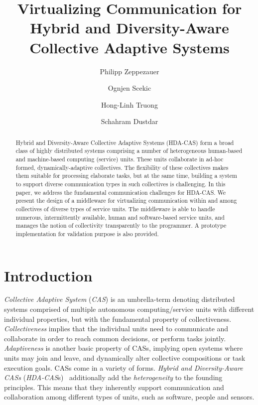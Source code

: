 \documentclass{llncs}
\begin{document}
%
\pagestyle{headings}  %

%
\title{Virtualizing Communication for Hybrid and Diversity-Aware Collective Adaptive Systems}
\author{Philipp Zeppezauer \and Ognjen Scekic \and Hong-Linh Truong \and Schahram Dustdar}


\maketitle


\begin{abstract}

Hybrid and Diversity-Aware Collective Adaptive Systems (HDA-CAS) form a broad class of highly distributed systems comprising a number of heterogeneous human-based and machine-based computing (service) units. These units collaborate in ad-hoc formed, dynamically-adaptive collectives. The flexibility of these collectives makes them suitable for processing elaborate tasks, but at the same time, building a system to support diverse communication types in such collectives is challenging. In this paper, we address the fundamental communication challenges for HDA-CAS. We present the design of a middleware for virtualizing communication  within and among collectives of diverse types of service units. The middleware is able to handle numerous, intermittently available, human and software-based service units, and manages the notion of collectivity transparently to the programmer. A prototype implementation for validation purpose is also provided.

\end{abstract}

\section{Introduction}
\label{sec:intro}

  \textit{Collective Adaptive System} (\textit{CAS}) \cite{FoCASBook} is an umbrella-term denoting distributed systems comprised of multiple autonomous computing/service units with different individual properties, but with the fundamental property of collectiveness. \emph{Collectiveness} implies that the individual units need to communicate and collaborate in order to reach common decisions, or perform tasks jointly. \emph{Adaptiveness} is another basic property of CASs, implying open systems where  units may join and leave, and dynamically alter collective compositions or task execution goals. 
  CASs come in a variety of forms. \textit{Hybrid and Diversity-Aware CASs} (\textit{HDA-CAS}s)~\cite{fausto} additionally add the \emph{heterogeneity} to the founding principles. This means that they inherently support communication and collaboration among different types of units, such as software, people and sensors. 
\end{document}
